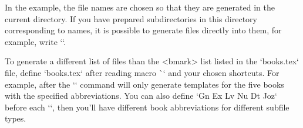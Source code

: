 {{{{In the example, the file names are chosen so that they are generated in the current
directory. If you have prepared subdirectories in this directory corresponding to
names, it is possible to generate files directly into them, for example, write
``.

To generate a different list of files than the <bmark> list
listed in the `books.tex` file, define `books.tex` after reading
macro \`\genbooks` and your chosen shortcuts. For example, after
\begtt
\def\genbooks {Gn Ex Lv Nu Dt Joz}
\endtt
%
the `\filegen` command will only generate templates for the five books with the specified
abbreviations. You can also define `\genbooks` before each `\filegen`, then
you'll have different book abbreviations for different subfile types.


%
%
%
%
%
%
%
%
%
%
}}}}
